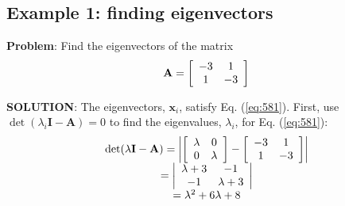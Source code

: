 \subsection*{Example 1: finding eigenvectors} %
\label{ssub:example_1}

\textbf{Problem}: Find the eigenvectors of the matrix
\begin{equation}
	{\bf{A}} = \left[ {\begin{array}{*{20}c}
	   { - 3} & 1  \\
	   1 & { - 3}  \\
	\end{array}} \right]
\end{equation}

\textbf{SOLUTION}: The eigenvectors, $\mathbf{x}_i$, satisfy Eq. (\ref{eq:581}). First, use $\det(\lambda_i\mathbf{I}-\mathbf{A})=0$ to find the eigenvalues, $\lambda_i$, for Eq. (\ref{eq:581}):
\[
\begin{array}{c}
 \det (\lambda {\bf{I}} - {\bf{A}}) = \left| {\left[ {\begin{array}{*{20}c}
   \lambda  & 0  \\
   0 & \lambda   \\
\end{array}} \right] - \left[ {\begin{array}{*{20}c}
   { - 3} & 1  \\
   1 & { - 3}  \\
\end{array}} \right]} \right| \\
  = \left| {\begin{array}{*{20}c}
   {\lambda  + 3} & { - 1}  \\
   { - 1} & {\lambda  + 3}  \\
\end{array}} \right| \\
  = \lambda ^2  + 6\lambda  + 8 \\
 \end{array}
\]

